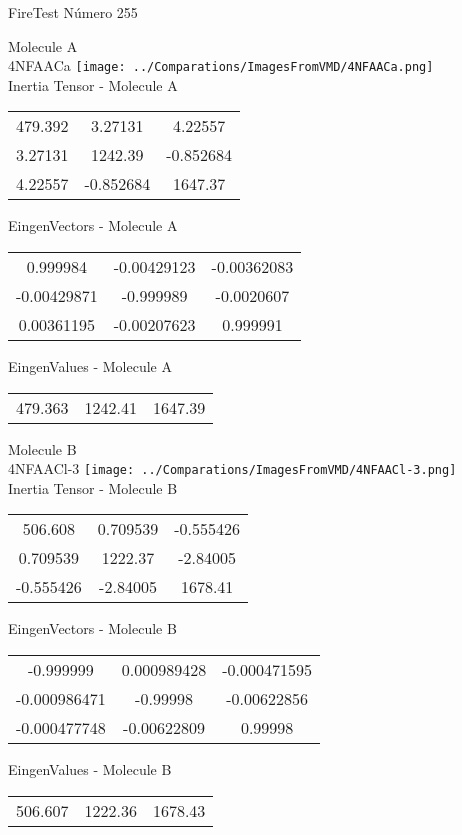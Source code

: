 \vtab[-2cm]
\begin{center}
{\large FireTest \tab Número 255}
\end{center}
\begin{multicols}{2}
\begin{center}

Molecule A \\ 
4NFAACa
\texttt{[image: ../Comparations/ImagesFromVMD/4NFAACa.png]}
\\
Inertia Tensor - Molecule A \\
\vtab

\begin{tabular}{|c c c|}
479.392	 & 	3.27131	 & 	4.22557	 \\
3.27131	 & 	1242.39	 & 	-0.852684	 \\
4.22557	 & 	-0.852684	 & 	1647.37
\end{tabular}

\vtab
 EingenVectors - Molecule A     \\
\vtab
\begin{tabular}{|c c c|}
0.999984	 & 	-0.00429123	 & 	-0.00362083	 \\
-0.00429871	 & 	-0.999989	 & 	-0.0020607	 \\
0.00361195	 & 	-0.00207623	 & 	0.999991
\end{tabular}

\vtab
 EingenValues - Molecule A     \\
\vtab
\begin{tabular}{|c c c|}
479.363	 & 	1242.41	 & 	1647.39	 \\
\end{tabular}
\columnbreak

Molecule B \\ 
4NFAACl-3
\texttt{[image: ../Comparations/ImagesFromVMD/4NFAACl-3.png]}
\\
Inertia Tensor - Molecule B \\
\vtab

\begin{tabular}{|c c c|}
506.608	 & 	0.709539	 & 	-0.555426	 \\
0.709539	 & 	1222.37	 & 	-2.84005	 \\
-0.555426	 & 	-2.84005	 & 	1678.41
\end{tabular}

\vtab
 EingenVectors - Molecule B     \\
\vtab
\begin{tabular}{|c c c|}
-0.999999	 & 	0.000989428	 & 	-0.000471595	 \\
-0.000986471	 & 	-0.99998	 & 	-0.00622856	 \\
-0.000477748	 & 	-0.00622809	 & 	0.99998
\end{tabular}

\vtab
 EingenValues - Molecule B     \\
\vtab
\begin{tabular}{|c c c|}
506.607	 & 	1222.36	 & 	1678.43	 \\
\end{tabular}

\end{center}
\end{multicols}
